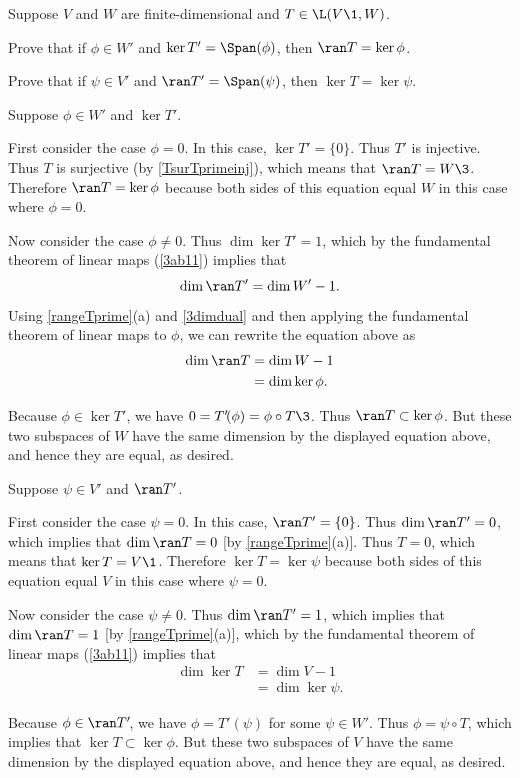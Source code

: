 \exercise
Suppose $V$ and $W$ are finite-dimensional and $T \in \L(V\1, W)$.
\begin{subtheorem}
\item
Prove that if $\phi \in W'$ and $\ker T' = \Span(\phi)$, then $\ran T = \ker \phi$.
\item
Prove that if $\psi \in V'$ and $\ran T' = \Span(\psi)$, then $\ker T = \ker \psi$.
\end{subtheorem}
\exercisesubtheoremend

\begin{Solution}
\begin{subtheorem}
\item
Suppose $\phi \in W'$ and $\ker T'$.

First consider the case $\phi = 0$. In this case, $\ker T' = \{0\}$. Thus $T'$ is injective. Thus $T$ is surjective (by \ref{TsurTprimeinj}), which means that $\ran T = W\3$. Therefore $\ran T = \ker \phi$ because both sides of this equation equal $W$ in this case where $\phi = 0$.

Now consider the case $\phi \ne 0$. Thus $\dim \ker T' = 1$, which by the fundamental theorem of linear maps (\ref{3ab11}) implies that
\[
\dim \ran T' = \dim W' - 1.
\]
Using \ref{rangeTprime}(a) and \ref{3dimdual} and then applying the fundamental theorem of linear maps to $\phi$, we can rewrite the equation above as
\begin{align*}
\dim \ran T &= \dim W - 1 \\
&= \dim \ker \phi.
\end{align*}

Because $\phi \in \ker T'$, we have $0 = T' \! (\phi) = \phi \circ T\3$. Thus $\ran T \subset \ker \phi$. But these two subspaces of $W$ have the same dimension by the displayed equation above, and hence they are equal, as desired.

\item
Suppose $\psi \in V'$ and $\ran T'$.

First consider the case $\psi = 0$. In this case, $\ran T' = \{0\}$. Thus $\dim \ran T' = 0$, which implies that $\dim \ran T = 0$ [by \ref{rangeTprime}(a)]. Thus $T = 0$, which means that $\ker T = V\1$. Therefore $\ker T = \ker \psi$ because both sides of this equation equal $V$ in this case where $\psi = 0$.

Now consider the case $\psi \ne 0$. Thus $\dim \ran T' = 1$, which implies that $\dim \ran T = 1$ [by \ref{rangeTprime}(a)], which by the fundamental theorem of linear maps (\ref{3ab11}) implies that
\begin{align*}
\dim \ker T &= \dim V - 1 \\
&= \dim \ker \psi.
\end{align*}

Because $\phi \in \ran T'\!$, we have $\phi = T' \! (\psi)$ for some $\psi \in W'\!$. Thus $\phi = \psi \circ T$, which implies that $\ker T \subset \ker \phi$. But these two subspaces of $V$ have the same dimension by the displayed equation above, and hence they are equal, as desired.
\end{subtheorem}
\end{Solution}

